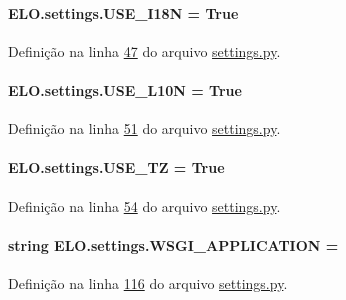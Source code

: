 \paragraph[{U\+S\+E\+\_\+\+I18\+N}]{\setlength{\rightskip}{0pt plus 5cm}E\+L\+O.\+settings.\+U\+S\+E\+\_\+\+I18\+N = True}\label{namespaceELO_1_1settings_a2d03ced1be44b9d7937bdbc870474ffe}


Definição na linha \hyperlink{settings_8py_source_l00047}{47} do arquivo \hyperlink{settings_8py_source}{settings.\+py}.

\hypertarget{namespaceELO_1_1settings_a863197f2699808509a4c32b38c16eb44}{}
\paragraph[{U\+S\+E\+\_\+\+L10\+N}]{\setlength{\rightskip}{0pt plus 5cm}E\+L\+O.\+settings.\+U\+S\+E\+\_\+\+L10\+N = True}\label{namespaceELO_1_1settings_a863197f2699808509a4c32b38c16eb44}


Definição na linha \hyperlink{settings_8py_source_l00051}{51} do arquivo \hyperlink{settings_8py_source}{settings.\+py}.

\hypertarget{namespaceELO_1_1settings_a8da4c6fc66af84d08bddc0249a473553}{}
\paragraph[{U\+S\+E\+\_\+\+T\+Z}]{\setlength{\rightskip}{0pt plus 5cm}E\+L\+O.\+settings.\+U\+S\+E\+\_\+\+T\+Z = True}\label{namespaceELO_1_1settings_a8da4c6fc66af84d08bddc0249a473553}


Definição na linha \hyperlink{settings_8py_source_l00054}{54} do arquivo \hyperlink{settings_8py_source}{settings.\+py}.

\hypertarget{namespaceELO_1_1settings_a065d3c6028b923c4918002832d2527be}{}
\paragraph[{W\+S\+G\+I\+\_\+\+A\+P\+P\+L\+I\+C\+A\+T\+I\+O\+N}]{\setlength{\rightskip}{0pt plus 5cm}string E\+L\+O.\+settings.\+W\+S\+G\+I\+\_\+\+A\+P\+P\+L\+I\+C\+A\+T\+I\+O\+N = \textquotesingle{}}\label{namespaceELO_1_1settings_a065d3c6028b923c4918002832d2527be}


Definição na linha \hyperlink{settings_8py_source_l00116}{116} do arquivo \hyperlink{settings_8py_source}{settings.\+py}.

